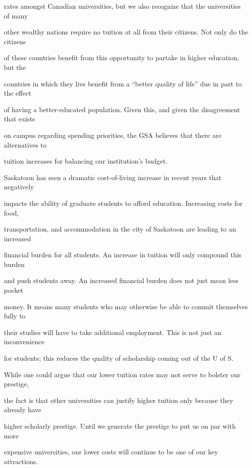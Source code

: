 rates amongst Canadian universities, but we  also recognize that the universities of many  

other wealthy nations require no tuition at all from their citizens. Not only do the citizens  

of  these  countries  benefit  from  this  opportunity  to  partake  in  higher  education,  but  the  

countries in which they live benefit from a “better quality of life” due in part to the effect  

of having a better-educated population. Given this, and given the disagreement that exists  

on campus regarding spending priorities, the GSA believes that there are alternatives to  

tuition increases for balancing our institution’s budget.  



Saskatoon  has  seen  a  dramatic  cost-of-living  increase  in  recent  years  that  negatively  

impacts  the  ability  of  graduate  students  to  afford  education.  Increasing  costs  for  food,  

transportation, and accommodation in the city of Saskatoon are leading to an increased  

financial burden for all students. An increase in tuition will only compound this burden  

and  push  students  away.  An  increased  financial  burden  does  not  just  mean  less  pocket  

money. It means many students who may otherwise be able to commit themselves fully to  

their studies will have to take additional employment. This is not just an inconvenience  

for students; this reduces the quality of scholarship coming out of the U of S.   



While one could argue that our lower tuition rates may not serve to bolster our prestige,  

the fact is that other universities can justify higher tuition only because they already have  

higher  scholarly  prestige.  Until  we  generate  the  prestige  to  put  us  on  par  with  more  

expensive universities, our lower costs will continue to be one of our key attractions.  



